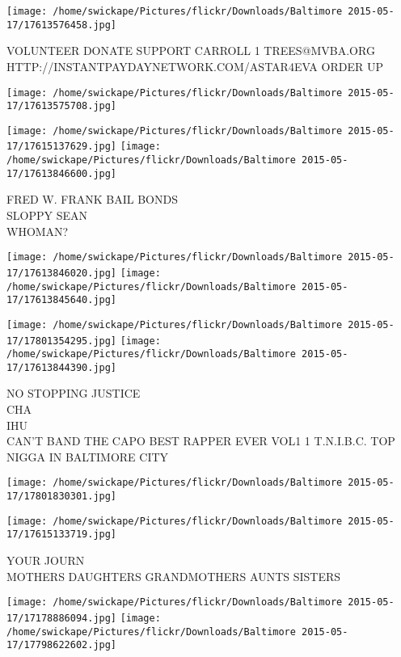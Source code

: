 \documentclass[10pt,letterpaper]{article}
\begin{document}
\vspace{0.25in}
\texttt{[image: /home/swickape/Pictures/flickr/Downloads/Baltimore 2015-05-17/17613576458.jpg]}

VOLUNTEER DONATE SUPPORT CARROLL 1 TREES@MVBA.ORG\\
HTTP://INSTANTPAYDAYNETWORK.COM/ASTAR4EVA ORDER UP
\pagebreak

\texttt{[image: /home/swickape/Pictures/flickr/Downloads/Baltimore 2015-05-17/17613575708.jpg]}

\vspace{0.25in}
\texttt{[image: /home/swickape/Pictures/flickr/Downloads/Baltimore 2015-05-17/17615137629.jpg]}
\texttt{[image: /home/swickape/Pictures/flickr/Downloads/Baltimore 2015-05-17/17613846600.jpg]}

FRED W. FRANK BAIL BONDS\\
SLOPPY SEAN\\
WHOMAN?
\pagebreak

\texttt{[image: /home/swickape/Pictures/flickr/Downloads/Baltimore 2015-05-17/17613846020.jpg]}
\texttt{[image: /home/swickape/Pictures/flickr/Downloads/Baltimore 2015-05-17/17613845640.jpg]}

\texttt{[image: /home/swickape/Pictures/flickr/Downloads/Baltimore 2015-05-17/17801354295.jpg]}
\texttt{[image: /home/swickape/Pictures/flickr/Downloads/Baltimore 2015-05-17/17613844390.jpg]}

NO STOPPING JUSTICE\\
CHA\\
IHU\\
CAN'T BAND THE CAPO BEST RAPPER EVER VOL1 1 T.N.I.B.C. TOP NIGGA IN BALTIMORE CITY
\pagebreak

\texttt{[image: /home/swickape/Pictures/flickr/Downloads/Baltimore 2015-05-17/17801830301.jpg]}

\vspace{0.25in}
\texttt{[image: /home/swickape/Pictures/flickr/Downloads/Baltimore 2015-05-17/17615133719.jpg]}

YOUR JOURN\\
MOTHERS DAUGHTERS GRANDMOTHERS AUNTS SISTERS
\pagebreak

\texttt{[image: /home/swickape/Pictures/flickr/Downloads/Baltimore 2015-05-17/17178886094.jpg]}
\texttt{[image: /home/swickape/Pictures/flickr/Downloads/Baltimore 2015-05-17/17798622602.jpg]}
\end{document}
